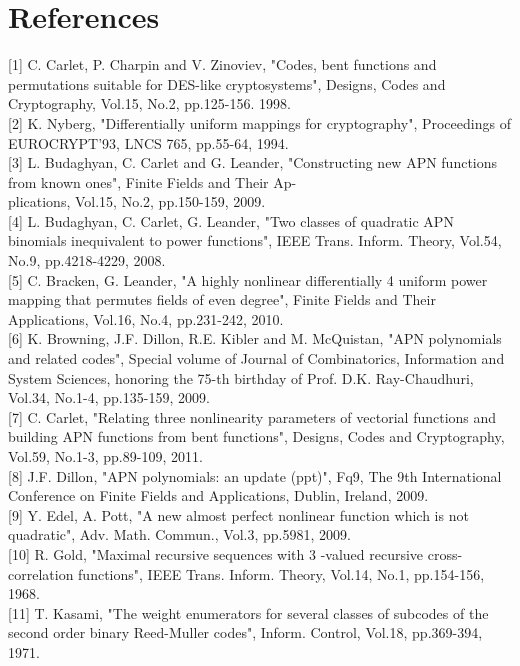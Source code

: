 \documentclass[10pt]{article}
\begin{document}
\section*{References}
[1] C. Carlet, P. Charpin and V. Zinoviev, "Codes, bent functions and permutations suitable for DES-like cryptosystems", Designs, Codes and Cryptography, Vol.15, No.2, pp.125-156. 1998.\\[0pt]
[2] K. Nyberg, "Differentially uniform mappings for cryptography", Proceedings of EUROCRYPT'93, LNCS 765, pp.55-64, 1994.\\[0pt]
[3] L. Budaghyan, C. Carlet and G. Leander, "Constructing new APN functions from known ones", Finite Fields and Their Ap-\\
plications, Vol.15, No.2, pp.150-159, 2009.\\[0pt]
[4] L. Budaghyan, C. Carlet, G. Leander, "Two classes of quadratic APN binomials inequivalent to power functions", IEEE Trans. Inform. Theory, Vol.54, No.9, pp.4218-4229, 2008.\\[0pt]
[5] C. Bracken, G. Leander, "A highly nonlinear differentially 4 uniform power mapping that permutes fields of even degree", Finite Fields and Their Applications, Vol.16, No.4, pp.231-242, 2010.\\[0pt]
[6] K. Browning, J.F. Dillon, R.E. Kibler and M. McQuistan, "APN polynomials and related codes", Special volume of Journal of Combinatorics, Information and System Sciences, honoring the 75-th birthday of Prof. D.K. Ray-Chaudhuri, Vol.34, No.1-4, pp.135-159, 2009.\\[0pt]
[7] C. Carlet, "Relating three nonlinearity parameters of vectorial functions and building APN functions from bent functions", Designs, Codes and Cryptography, Vol.59, No.1-3, pp.89-109, 2011.\\[0pt]
[8] J.F. Dillon, "APN polynomials: an update (ppt)", Fq9, The 9th International Conference on Finite Fields and Applications, Dublin, Ireland, 2009.\\[0pt]
[9] Y. Edel, A. Pott, "A new almost perfect nonlinear function which is not quadratic", Adv. Math. Commun., Vol.3, pp.5981, 2009.\\[0pt]
[10] R. Gold, "Maximal recursive sequences with 3 -valued recursive cross-correlation functions", IEEE Trans. Inform. Theory, Vol.14, No.1, pp.154-156, 1968.\\[0pt]
[11] T. Kasami, "The weight enumerators for several classes of subcodes of the second order binary Reed-Muller codes", Inform. Control, Vol.18, pp.369-394, 1971.\\[0pt]
\end{document}
